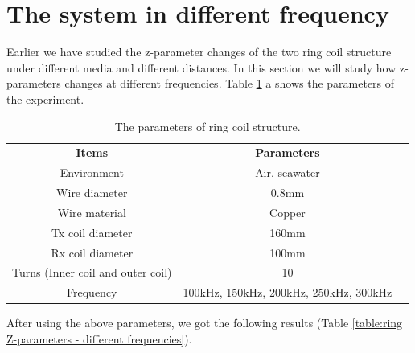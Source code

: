 \section{The system in different frequency}
Earlier we have studied the z-parameter changes of the two ring coil structure under different media and different distances. In this section we will study how z-parameters changes at different frequencies. Table \ref{table:ring coil parameters - different frequencies} a shows the parameters of the experiment.

\begin{table}[!t]
    \centering
    \caption{The parameters of ring coil structure.}
    \begin{tabular}{ c|cc }
        \thickhline
        \textbf{Items}                    & \textbf{Parameters}                    \\
        \thickhline
        Environment                       & Air, seawater                          \\ \hline
        Wire diameter                     & 0.8mm                                  \\ \hline
        Wire material                     & Copper                                 \\
        \hline
        Tx coil diameter                  & 160mm                                  \\ \hline
        Rx coil diameter                  & 100mm                                  \\ \hline
        Turns (Inner coil and outer coil) & 10                                     \\ \hline
        Frequency                         & 100kHz, 150kHz, 200kHz, 250kHz, 300kHz \\ \hline
    \end{tabular}
    \label{table:ring coil parameters - different frequencies}
\end{table}

After using the above parameters, we got the following results (Table \ref{table:ring Z-parameters - different frequencies}).

